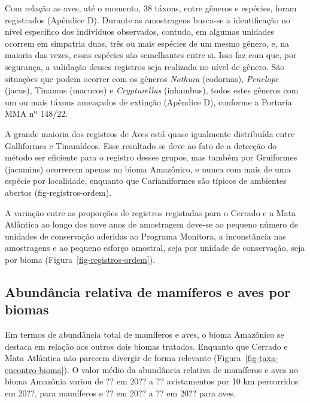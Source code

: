 \documentclass[
  letterpaper,
]{scrbook}
\begin{document}
Com relação as aves, até o momento, 38 táxons, entre gêneros e espécies,
foram registrados (Apêndice D). Durante as amostragens busca-se a
identificação no nível específico dos indivíduos observados, contudo, em
algumas unidades ocorrem em simpatria duas, três ou mais espécies de um
mesmo gênero, e, na maioria das vezes, essas espécies são semelhantes
entre si. Isso faz com que, por segurança, a validação desses registros
seja realizada no nível de gênero. São situações que podem ocorrer com
os gêneros \emph{Nothura} (codornas), \emph{Penelope} (jacus), Tinamus
(macucos) e \emph{Crypturellus} (inhambus), todos estes gêneros com um
ou mais táxons ameaçados de extinção (Apêndice D), conforme a Portaria
MMA nº 148/22.

A grande maioria dos registros de Aves está quase igualmente distribuída
entre Galliformes e Tinamídeos. Esse resultado se deve ao fato de a
detecção do método ser eficiente para o registro desses grupos, mas
também por Gruiformes (jacamins) ocorrerem apenas no bioma Amazônico, e
nunca com mais de uma espécie por localidade, enquanto que Cariamiformes
são típicos de ambientes abertos (fig-registros-ordem).

A variação entre as proporções de registros registadas para o Cerrado e
a Mata Atlântica ao longo dos nove anos de amostragem deve-se ao pequeno
número de unidades de conservação aderidas ao Programa Monitora, a
inconstância nas amostragens e ao pequeno esforço amostral, seja por
unidade de conservação, seja por bioma
(Figura~\ref{fig-registros-ordem}).

\subsection{Abundância relativa de mamíferos e aves por
biomas}\label{abunduxe2ncia-relativa-de-mamuxedferos-e-aves-por-biomas}

Em termos de abundância total de mamíferos e aves, o bioma Amazônico se
destaca em relação aos outros dois biomas tratados. Enquanto que Cerrado
e Mata Atlântica não parecem divergir de forma relevante
(Figura~\ref{fig-taxa-encontro-bioma}). O valor médio da abundância
relativa de mamíferos e aves no bioma Amazônia variou de ?? em 20?? a ??
avistamentos por 10 km percorridos em 20??, para mamíferos e ?? em 20??
a ?? em 20?? para aves.
\end{document}
